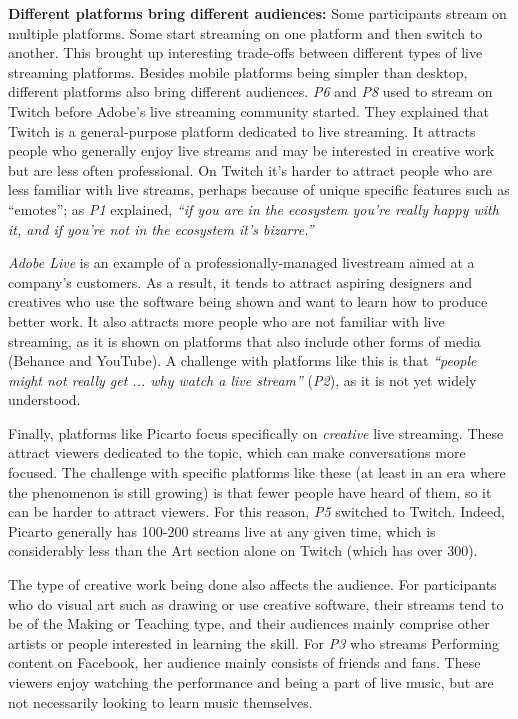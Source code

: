 
\textbf{Different platforms bring different audiences:}
Some participants stream on multiple platforms. Some start streaming on one platform and then switch to another. This brought up interesting trade-offs between different types of live streaming platforms. Besides mobile platforms being simpler than desktop, different platforms also bring different audiences. \textit{P6} and \textit{P8} used to stream on Twitch before Adobe's live streaming community started. They explained that Twitch is a general-purpose platform dedicated to live streaming. It attracts people who generally enjoy live streams and may be interested in creative work but are less often professional. On Twitch it's harder to attract people who are less familiar with live streams, perhaps because of unique specific features such as ``emotes''; as \textit{P1} explained, \textit{``if you are in the ecosystem you're really happy with it, and if you're not in the ecosystem it's bizarre.''}

\textit{Adobe Live} is an example of a professionally-managed live\-stream aimed at a company's customers. As a result, it tends to attract aspiring designers and creatives who use the software being shown and want to learn how to produce better work. It also attracts more people who are not familiar with live streaming, as it is shown on platforms that also include other forms of media (Behance and YouTube). A challenge with platforms like this is that \textit{``people might not really get ... why watch a live stream''} (\textit{P2}), as it is not yet widely understood.

Finally, platforms like Picarto focus specifically on \textit{creative} live streaming. These attract viewers dedicated to the topic, which can make conversations more focused. The challenge with specific platforms like these (at least in an era where the phenomenon is still growing) is that fewer people have heard of them, so it can be harder to attract viewers. For this reason, \textit{P5} switched to Twitch. Indeed, Picarto generally has 100-200 streams live at any given time, which is considerably less than the Art section alone on Twitch (which has over 300).

The type of creative work being done also affects the audience. For participants who do visual art such as drawing or use creative software, their streams tend to be of the Making or Teaching type, and their audiences mainly comprise other artists or people interested in learning the skill. For \textit{P3} who streams Performing content on Facebook, her audience mainly consists of friends and fans. These viewers enjoy watching the performance and being a part of live music, but are not necessarily looking to learn music themselves.
 
